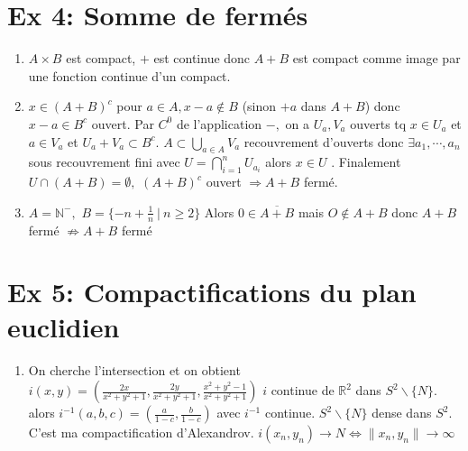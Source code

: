 \documentclass[a4paper]{article}
\begin{document}
\section*{Ex 4: Somme de fermés}
\begin{enumerate}
    \item $A\times B$ est compact, $+$ est continue donc $A+B$ est compact comme image par une fonction continue d'un compact.
    \item $x\in \left( A+B \right) ^c$ pour $a\in A, x-a\not\in B$ (sinon $+a$ dans $A+B$) donc $x-a\in B^c$ ouvert. Par $C^0$ de l'application $-,$ on a $U_a,V_a$ ouverts tq $x\in U_a$ et $a\in V_a$ et $U_a+V_a\subset B^c.$ $A\subset \bigcup\limits_{a\in A} V_a$ recouvrement d'ouverts donc $\exists a_1,\cdots,a_n$ sous recouvrement fini avec $U=\bigcap\limits_{i=1}^nU_{a_i}$ alors $x\in U$ . Finalement $U\cap (A+B)=\emptyset ,$ $(A+B)^c$ ouvert $\Rightarrow A+B$ fermé.
    \item $A=\mathbb{N} ^-,$ $B=\{-n+\frac{1}{n}\ |\ n\ge 2\} $ Alors $0\in \overline{A+B}$ mais $O\not\in A+B$ donc $A+B$ fermé $\not\Rightarrow A+B$ fermé
\end{enumerate}


\section*{Ex 5: Compactifications du plan euclidien}
\begin{enumerate}
    \item On cherche l'intersection et on obtient $i(x,y)=\left( \frac{2x}{x^2+y^2+1}, \frac{2y}{x^2+y^2+1}, \frac{x^2+y^2-1}{x^2+y^2+1} \right) $ $i$ continue de $\mathbb{R} ^2$ dans $S^2\backslash \{N\} .$ alors $i^{-1} (a,b,c)=\left( \frac{a}{1-c},\frac{b}{1-c} \right) $ avec $i^{-1} $ continue. $S^2\backslash \{N\} $ dense dans $S^2.$ C'est ma compactification d'Alexandrov. $i(x_{n},y_n)\to N\Leftrightarrow \|x_{n},y_n\|\to \infty $
\end{enumerate}
\end{document}
